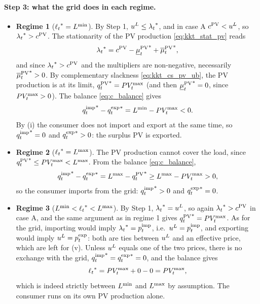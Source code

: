 \paragraph{Step 3: what the grid does in each regime.}
\begin{itemize}
    \item \textbf{Regime 1} (${\ell_{t}}^* = L^{\min}$). By Step 1, $u^{L} \leq {\lambda_{t}}^*$, and in
    case A $c^{\mathrm{PV}} < u^{L}$, so ${\lambda_{t}}^* > c^{\mathrm{PV}}$. The stationarity of the PV production
    \eqref{eq:kkt_stat_pv} reads
    \begin{equation}
        {\lambda_{t}}^* = c^{\mathrm{PV}} - {\underline{\mu}^{\mathrm{PV}}_{t}}^* + {\overline{\mu}^{\mathrm{PV}}_{t}}^*,
    \end{equation}
    and since ${\lambda_{t}}^* > c^{\mathrm{PV}}$ and the multipliers are non-negative, necessarily
    ${\overline{\mu}^{\mathrm{PV}}_{t}}^* > 0$. By complementary slackness \eqref{eq:kkt_cs_pv_ub}, the PV production
    is at its limit, ${q^{\mathrm{PV}}_{t}}^* = PV_{t}^{\max}$ (and then ${\underline{\mu}^{\mathrm{PV}}_{t}}^* = 0$, since $PV_{t}^{\max} > 0$).
    The balance \eqref{eq:c_balance} gives
    \begin{equation}
        {q^{\mathrm{imp}}_{t}}^* - {q^{\mathrm{exp}}_{t}}^* = L^{\min} - PV_{t}^{\max} < 0.
    \end{equation}
    By (i) the consumer does not import and export at the same time, so ${q^{\mathrm{imp}}_{t}}^* = 0$ and
    ${q^{\mathrm{exp}}_{t}}^* > 0$: the surplus PV is exported.
    \item \textbf{Regime 2} (${\ell_{t}}^* = L^{\max}$). The PV production cannot cover the load,
    since ${q^{\mathrm{PV}}_{t}}^* \leq PV_{t}^{\max} < L^{\max}$. From the balance \eqref{eq:c_balance},
    \begin{equation}
        {q^{\mathrm{imp}}_{t}}^* - {q^{\mathrm{exp}}_{t}}^* = L^{\max} - {q^{\mathrm{PV}}_{t}}^* \geq L^{\max} - PV_{t}^{\max} > 0,
    \end{equation}
    so the consumer imports from the grid: ${q^{\mathrm{imp}}_{t}}^* > 0$ and ${q^{\mathrm{exp}}_{t}}^* = 0$.
    \item \textbf{Regime 3} ($L^{\min} < {\ell_{t}}^* < L^{\max}$). By Step 1, ${\lambda_{t}}^* = u^{L}$, so
    again ${\lambda_{t}}^* > c^{\mathrm{PV}}$ in case A, and the same argument as in regime 1 gives
    ${q^{\mathrm{PV}}_{t}}^* = PV_{t}^{\max}$. As for the grid, importing would imply ${\lambda_{t}}^* = p^{\mathrm{imp}}_{t}$, i.e.\
    $u^{L} = p^{\mathrm{imp}}_{t}$, and exporting would imply $u^{L} = p^{\mathrm{exp}}_{t}$: both are ties between $u^{L}$ and an
    effective price, which are left for (v). Unless $u^{L}$ equals one of the two prices, there is
    no exchange with the grid, ${q^{\mathrm{imp}}_{t}}^* = {q^{\mathrm{exp}}_{t}}^* = 0$, and the balance gives
    \begin{equation}
        {\ell_{t}}^* = PV_{t}^{\max} + 0 - 0 = PV_{t}^{\max},
    \end{equation}
    which is indeed strictly between $L^{\min}$ and $L^{\max}$ by assumption. The consumer runs on
    its own PV production alone.
\end{itemize}


